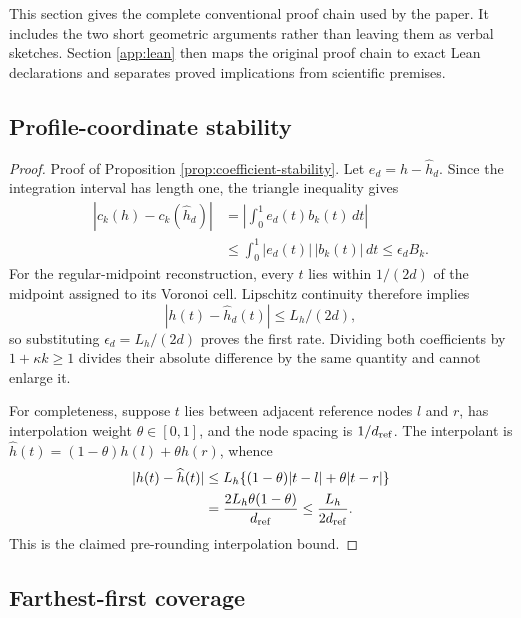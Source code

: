 This section gives the complete conventional proof chain used by the paper.
It includes the two short geometric arguments rather than leaving them as
verbal sketches.  Section \ref{app:lean} then maps the original proof chain to exact Lean
declarations and separates proved implications from scientific premises.

\subsection{Profile-coordinate stability}\label{app:proof-profile}

\begin{proof}{Proof of Proposition \ref{prop:coefficient-stability}.}
Let $e_d=h-\widehat h_d$.  Since the integration interval has length one,
the triangle inequality gives
\begin{align*}
 |c_k(h)-c_k(\widehat h_d)|
 &=\left|\int_0^1 e_d(t)b_k(t)\,dt\right|\\
 &\le\int_0^1 |e_d(t)|\,|b_k(t)|\,dt
 \le\epsilon_dB_k.
\end{align*}
For the regular-midpoint reconstruction, every $t$ lies within $1/(2d)$ of
the midpoint assigned to its Voronoi cell.  Lipschitz continuity therefore
implies
\[
 |h(t)-\widehat h_d(t)|\le L_h/(2d),
\]
so substituting $\epsilon_d=L_h/(2d)$ proves the first rate.  Dividing both
coefficients by $1+\kappa k\ge1$ divides their absolute difference by the same
quantity and cannot enlarge it.

For completeness, suppose $t$ lies between adjacent reference nodes $l$ and
$r$, has interpolation weight $\theta\in[0,1]$, and the node spacing is
$1/d_{\rm ref}$.  The interpolant is
$\widehat h(t)=(1-\theta)h(l)+\theta h(r)$, whence
\begin{align*}
 |h(t)-\widehat h(t)|
 &\le L_h\{(1-\theta)|t-l|+\theta|t-r|\}\\
 &=\frac{2L_h\theta(1-\theta)}{d_{\rm ref}}
 \le\frac{L_h}{2d_{\rm ref}}.
\end{align*}
This is the claimed pre-rounding interpolation bound.
\end{proof}

\subsection{Farthest-first coverage}\label{app:proof-kcenter}

